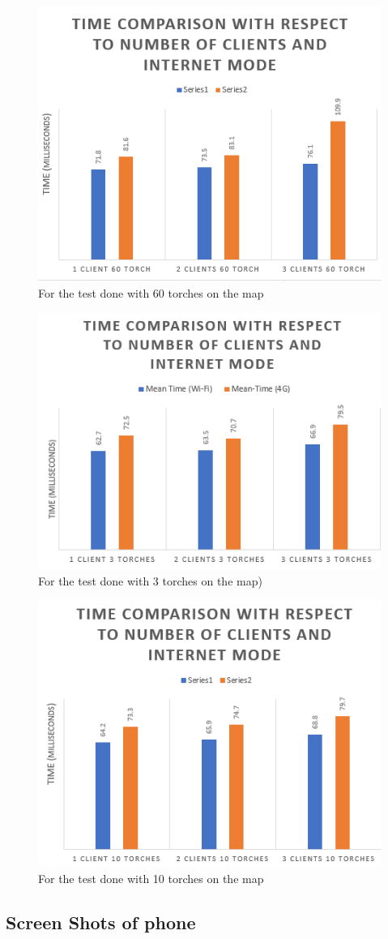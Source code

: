 \documentclass[12pt,a4paper,twoside]{report}
\begin{document}
\begin{thebibliography}{widestlabel}
 \begin{figure}[htps]
     \centering
     \includegraphics[width=0.5\linewidth]{tc1.png}
     \caption{For the test done with 60 torches on the map}
     \label{60torch}
 \end{figure}
 
 
 \begin{figure}[htps]
     \centering
     \includegraphics[width=0.5\linewidth]{tc2.png}
     \caption{For the test done with 3 torches on the map)}
     \label{3torch}
 \end{figure}
 
  \begin{figure}[htps]
     \centering
     \includegraphics[width=0.5\linewidth]{tc3.png}
     \caption{For the test done with 10 torches on the map}
     \label{10torch}
 \end{figure}
 
 \subsection{Screen Shots of phone}



\end{thebibliography}



\end{document}
